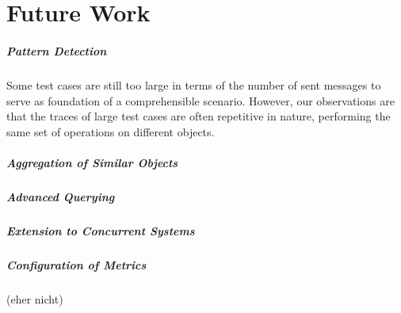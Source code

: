 \chapter{Future Work}
\label{c:futurework}

\paragraph{Pattern Detection} Some test cases are still too large in terms of the number of sent messages to serve as foundation of a comprehensible scenario. However, our observations are that the traces of large test cases are often repetitive in nature, performing the same set of operations on different objects.

\paragraph{Aggregation of Similar Objects}

\paragraph{Advanced Querying}

\paragraph{Extension to Concurrent Systems}

\paragraph{Configuration of Metrics} (eher nicht)